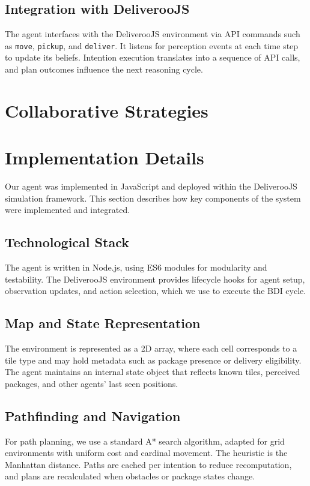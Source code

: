 \documentclass[conference]{IEEEtran}
\begin{document}
\subsection{Integration with DeliverooJS}

The agent interfaces with the DeliverooJS environment via API commands such as \texttt{move}, \texttt{pickup}, and \texttt{deliver}. It listens for perception events at each time step to update its beliefs. Intention execution translates into a sequence of API calls, and plan outcomes influence the next reasoning cycle.

\section{Collaborative Strategies}

\section{Implementation Details}

Our agent was implemented in JavaScript and deployed within the DeliverooJS simulation framework. This section describes how key components of the system were implemented and integrated.

\subsection{Technological Stack}
The agent is written in Node.js, using ES6 modules for modularity and testability. The DeliverooJS environment provides lifecycle hooks for agent setup, observation updates, and action selection, which we use to execute the BDI cycle.

\subsection{Map and State Representation}
The environment is represented as a 2D array, where each cell corresponds to a tile type and may hold metadata such as package presence or delivery eligibility. The agent maintains an internal state object that reflects known tiles, perceived packages, and other agents' last seen positions.

\subsection{Pathfinding and Navigation}
For path planning, we use a standard A* search algorithm, adapted for grid environments with uniform cost and cardinal movement. The heuristic is the Manhattan distance. Paths are cached per intention to reduce recomputation, and plans are recalculated when obstacles or package states change.
\end{document}
